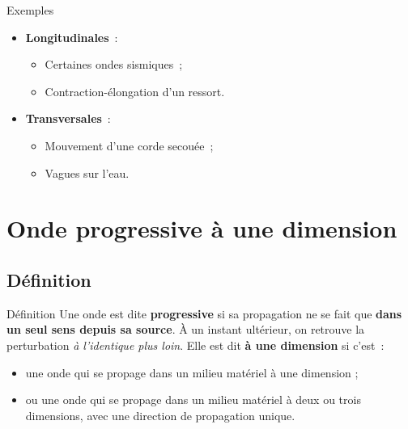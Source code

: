 \documentclass[../main/main.tex]{subfiles}
\begin{document}
\begin{rexem}{Exemples}
    \begin{minipage}{0.50\linewidth}
        \begin{itemize}
            \item \textbf{Longitudinales}~:
                \begin{itemize}
                    \item Certaines ondes sismiques~;
                    \item Contraction-élongation d'un ressort.
                \end{itemize}
        \end{itemize}
    \end{minipage}
    \hfill
    \begin{minipage}{0.48\linewidth}
        \begin{itemize}
            \item \textbf{Transversales}~:
                \begin{itemize}
                    \item Mouvement d'une corde secouée~;
                    \item Vagues sur l'eau.
                \end{itemize}
        \end{itemize}
    \end{minipage}
\end{rexem}

\section{Onde progressive à une dimension}
\subsection{Définition}
\begin{bdefi}{Définition}
    Une onde est dite \textbf{progressive} si sa propagation ne se fait que
    \textbf{dans un seul sens depuis sa source}. À un instant ultérieur, on
    retrouve la perturbation \textit{à l’identique plus loin}. \bigbreak
    Elle est dit \textbf{à une dimension} si c'est~:
    \begin{itemize}
        \item une onde qui se propage dans un milieu matériel à une dimension ;
        \item ou une onde qui se propage dans un milieu matériel à deux ou trois
            dimensions, avec une direction de propagation unique.
    \end{itemize}
\end{bdefi}
\end{document}
